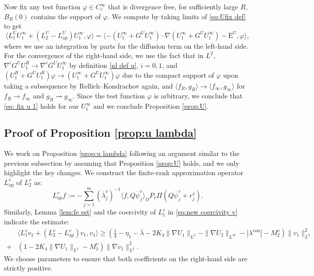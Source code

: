 \documentclass[11pt,a4paper]{article}
\numberwithin{equation}{section}
\newcommand{\Epsilon}{\mathrm{E}}
\newcommand{\assign}{:=}
\newcommand{\tmop}[1]{\ensuremath{\operatorname{#1}}}
\begin{document}
Now fix any test function $\varphi\in C^\infty_c$ that is divergence free, for sufficiently large $R$, $B_{R}(0)$ contains the support of $\varphi$. We compute by taking limits of \eqref{eq:Ufix def} to get $$\langle L_1^U U_1^\infty + (L_2^U - L_{\tmop{ap}}^{U}) U_1^\infty , \varphi \rangle =  \langle-(U_1^\infty +
   G^{U} U_1^\infty) \cdot \nabla   (U_1^\infty +
   G^{U} U_1^\infty) - \Epsilon^U,\varphi \rangle,$$
   where we use an integration by parts for the diffusion term on the left-hand side.
  For the convergence of the right-hand side, we use the fact that in $L^2$, $\nabla^i G^{U}U_1^R\to\nabla^i G^{U}U_1^\infty$ by definition \eqref{nl def u}, $i=0,1$, and $(U_1^R +
   G^{U} U_1^R)\varphi\to(U_1^\infty +
   G^{U} U_1^\infty)\varphi$ due to the compact support of $\varphi$ upon taking a subsequence by Rellich–Kondrachov again, and $\langle f_R,g_R\rangle\to\langle f_\infty,g_\infty\rangle$ for $f_R\to f_\infty$ and $g_R \rightharpoonup g_\infty$.
   Since the test function $\varphi$ is arbitrary, we conclude that \eqref{eq: fix u 1} holds for our $U_1^\infty$ and we conclude Proposition \ref{prop:U}.
\subsection{Proof of Proposition \ref{prop:u lambda}}\label{Sec:prop 4}
We work on Proposition \ref{prop:u lambda} following an argument similar  to the previous subsection by assuming that Proposition \ref{prop:U} holds, and we only highlight the key changes. We construct the finite-rank
approximation operator $L_{\tmop{ap}}^{v}$ of $L_2^v$ as:
\begin{equation*}
  L_{\tmop{ap}}^{v} f \assign -\sum_{j = 1}^m (\overline{\lambda}_j^v)^{-1}\langle f, Q\overline\psi_j^v \rangle_{
  \Omega} P_{\overline{v}} \Pi (Q \overline\psi_j^v + r_j^v).
  \label{eq:Lap def2}
\end{equation*}
Similarly, Lemma \ref{lem:fe est} and the coercivity of $L_1^v$ in \eqref{eq:new coercivity v} indicate the estimate:
\begin{align}
  & \langle L_1^v v_1 + (L_2^v - L_{\tmop{ap}}^{v}) v_1,
  v_1 \rangle \nonumber \geqslant ( \frac{1}{4} - \eta_1 - \overline{\lambda} - 2K_4 \| \nabla
  U_1 \|_{L^2} - \| \nabla U_2 \|_{L^{\infty}} - | \lambda^\text{con} | - M_2^v ) \| v_1 \|_{L^2}^2\\
  + & (1 - 2K_4 \| \nabla U_1 \|_{L^2} -
  M_1^v) \| \nabla v_1 \|_{L^2}^2 .  \label{eq:Tv lin est}
\end{align}
We choose parameters to ensure that both coefficients on the right-hand side are
strictly positive.
\end{document}
